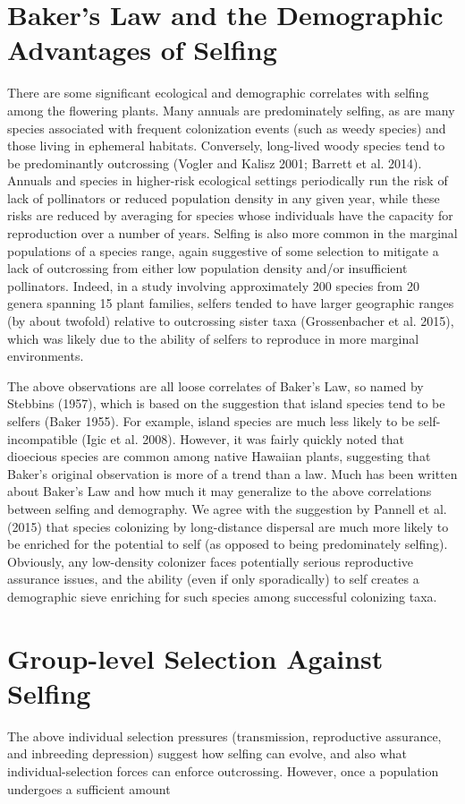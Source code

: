 \documentclass{article}
\begin{document}
\section{Baker's Law and the Demographic Advantages of Selfing}
There are some significant ecological and demographic correlates with selfing among the flowering plants. Many annuals are predominately selfing, as are many species associated with frequent colonization events (such as weedy species) and those living in ephemeral habitats. Conversely, long-lived woody species tend to be predominantly outcrossing (Vogler and Kalisz 2001; Barrett et al. 2014). Annuals and species in higher-risk ecological settings periodically run the risk of lack of pollinators or reduced population density in any given year, while these risks are reduced by averaging for species whose individuals have the capacity for reproduction over a number of years. Selfing is also more common in the marginal populations of a species range, again suggestive of some selection to mitigate a lack of outcrossing from either low population density and/or insufficient pollinators. Indeed, in a study involving approximately 200 species from 20 genera spanning 15 plant families, selfers tended to have larger geographic ranges (by about twofold) relative to outcrossing sister taxa (Grossenbacher et al. 2015), which was likely due to the ability of selfers to reproduce in more marginal environments.

The above observations are all loose correlates of Baker's Law, so named by Stebbins (1957), which is based on the suggestion that island species tend to be selfers (Baker 1955). For example, island species are much less likely to be self-incompatible (Igic et al. 2008). However, it was fairly quickly noted that dioecious species are common among native Hawaiian plants, suggesting that Baker's original observation is more of a trend than a law. Much has been written about Baker's Law and how much it may generalize to the above correlations between selfing and demography. We agree with the suggestion by Pannell et al. (2015) that species colonizing by long-distance dispersal are much more likely to be enriched for the potential to self (as opposed to being predominately selfing). Obviously, any low-density colonizer faces potentially serious reproductive assurance issues, and the ability (even if only sporadically) to self creates a demographic sieve enriching for such species among successful colonizing taxa.

\section{Group-level Selection Against Selfing}
The above individual selection pressures (transmission, reproductive assurance, and inbreeding depression) suggest how selfing can evolve, and also what individual-selection forces can enforce outcrossing. However, once a population undergoes a sufficient amount
\end{document}
